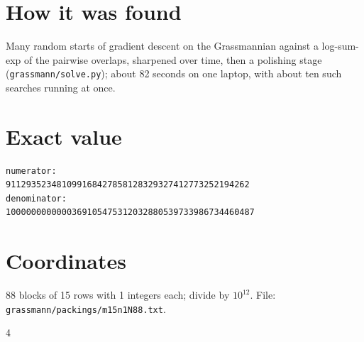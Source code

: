 \documentclass[11pt,a4paper]{article}
\begin{document}
\section{How it was found}
Many random starts of gradient descent on the Grassmannian against a log-sum-exp of the pairwise overlaps, sharpened over time, then a polishing stage (\texttt{grassmann/solve.py}); about 82 seconds on one laptop, with about ten such searches running at once.


\appendix
\section{Exact value}
{\small
\begin{verbatim}
numerator:
911293523481099168427858128329327412773252194262
denominator:
1000000000000369105475312032880539733986734460487
\end{verbatim}}

\section{Coordinates}
88 blocks of 15 rows with 1 integers each; divide by $10^{12}$. File: \texttt{grassmann/packings/m15n1N88.txt}.
{\tiny
\begin{multicols}{4}
\end{multicols}}
\end{document}
